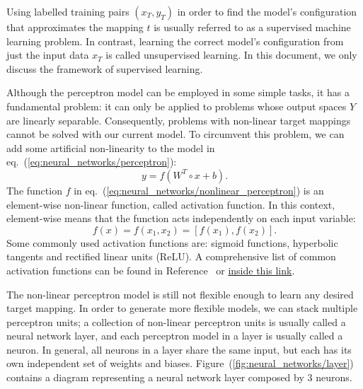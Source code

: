 Using labelled training pairs $(x_T, y_T)$ in order to find the model's configuration that approximates the
mapping $t$ is usually referred to as a supervised machine learning problem. In contrast, learning the correct
model's configuration from just the input data $x_T$ is called unsupervised learning. In this document, we
only discuss the framework of supervised learning.

Although the perceptron model can be employed in some simple tasks, it has a fundamental problem: it can only
be applied to problems whose output spaces $Y$ are linearly separable. Consequently, problems with non-linear
target mappings cannot be solved with our current model. To circumvent this problem, we can add some
artificial non-linearity to the model in eq.~(\ref{eq:neural_networks/perceptron}):
\begin{equation}
    y = f(W^T \circ x + b).
    \label{eq:neural_networks/nonlinear_perceptron}
\end{equation}
The function $f$ in eq.~(\ref{eq:neural_networks/nonlinear_perceptron}) is an element-wise non-linear
function, called activation function. In this context, element-wise means that the function acts independently
on each input variable:
\begin{equation}
   f(x) = f(x_1, x_2) = [f(x_1), f(x_2)].
\end{equation}
Some commonly used activation functions are: sigmoid functions, hyperbolic tangents and rectified linear units
(ReLU). A comprehensive list of common activation functions can be found in Reference~\cite{PyTorch} or
\href{https://pytorch.org/docs/stable/nn.html}{inside this link}.

The non-linear perceptron model is still not flexible enough to learn any desired target mapping. In order to
generate more flexible models, we can stack multiple perceptron units; a collection of non-linear perceptron
units is usually called a neural network layer, and each perceptron model in a layer is usually called a
neuron. In general, all neurons in a layer share the same input, but each has its own independent set of
weights and biases. Figure~(\ref{fig:neural_networks/layer}) contains a diagram representing a neural network
layer composed by $3$ neurons. 

